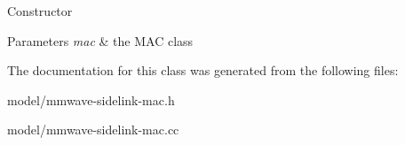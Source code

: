 Constructor


\begin{DoxyParams}{Parameters}
{\em mac} & the M\+AC class \\
\hline
\end{DoxyParams}


The documentation for this class was generated from the following files\+:\begin{DoxyCompactItemize}
\item 
model/mmwave-\/sidelink-\/mac.\+h\item 
model/mmwave-\/sidelink-\/mac.\+cc\end{DoxyCompactItemize}
